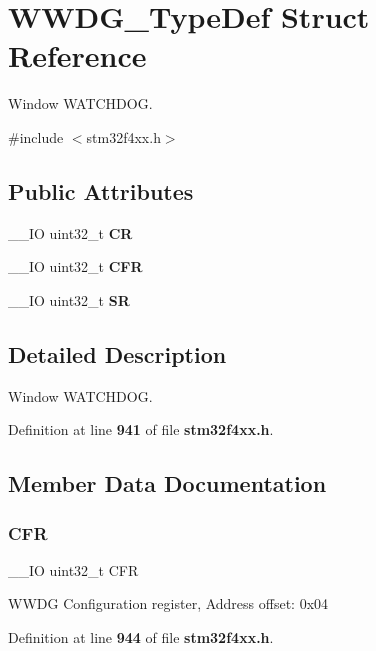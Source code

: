 \section{W\+W\+D\+G\+\_\+\+Type\+Def Struct Reference}
\label{structWWDG__TypeDef}


Window W\+A\+T\+C\+H\+D\+OG.  




{\ttfamily \#include $<$stm32f4xx.\+h$>$}

\subsection*{Public Attributes}
\begin{DoxyCompactItemize}
\item 
\+\_\+\+\_\+\+IO uint32\+\_\+t \textbf{ CR}
\item 
\+\_\+\+\_\+\+IO uint32\+\_\+t \textbf{ C\+FR}
\item 
\+\_\+\+\_\+\+IO uint32\+\_\+t \textbf{ SR}
\end{DoxyCompactItemize}


\subsection{Detailed Description}
Window W\+A\+T\+C\+H\+D\+OG. 

Definition at line \textbf{ 941} of file \textbf{ stm32f4xx.\+h}.



\subsection{Member Data Documentation}
\mbox{\label{structWWDG__TypeDef_ac011ddcfe531f8e16787ea851c1f3667}} 
\subsubsection{C\+FR}
{\footnotesize\ttfamily \+\_\+\+\_\+\+IO uint32\+\_\+t C\+FR}

W\+W\+DG Configuration register, Address offset\+: 0x04 

Definition at line \textbf{ 944} of file \textbf{ stm32f4xx.\+h}.

\mbox{\label{structWWDG__TypeDef_ab40c89c59391aaa9d9a8ec011dd0907a}} 
